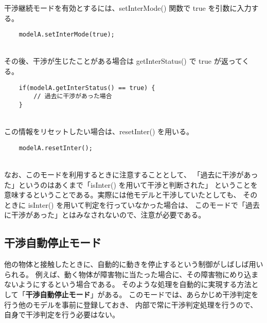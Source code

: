 干渉継続モードを有効とするには、setInterMode() 関数で true を引数に入力する。
\\
\begin{breakbox}
\begin{verbatim}
    modelA.setInterMode(true);
\end{verbatim}
\end{breakbox}
~ \\
その後、干渉が生じたことがある場合は getInterStatus() で true が返ってくる。
\\
\begin{breakbox}
\begin{verbatim}
    if(modelA.getInterStatus() == true) {
        // 過去に干渉があった場合
    }
\end{verbatim}
\end{breakbox}
~ \\
この情報をリセットしたい場合は、resetInter() を用いる。
\\
\begin{breakbox}
\begin{verbatim}
    modelA.resetInter();
\end{verbatim}
\end{breakbox}
~ \\
なお、このモードを利用するときに注意することとして、
「過去に干渉があった」というのはあくまで「isInter() を用いて干渉と判断された」
ということを意味するということである。実際には他モデルと干渉していたとしても、
そのときに isInter() を用いて判定を行っていなかった場合は、
このモードで「過去に干渉があった」とはみなされないので、注意が必要である。

\subsection{干渉自動停止モード}
他の物体と接触したときに、自動的に動きを停止するという制御がしばしば用いられる。
例えば、動く物体が障害物に当たった場合に、その障害物にめり込まないようにするという場合である。
そのような処理を自動的に実現する方法として「\textbf{干渉自動停止モード}」がある。
このモードでは、あらかじめ干渉判定を行う他のモデルを事前に登録しておき、
内部で常に干渉判定処理を行うので、自身で干渉判定を行う必要はない。


